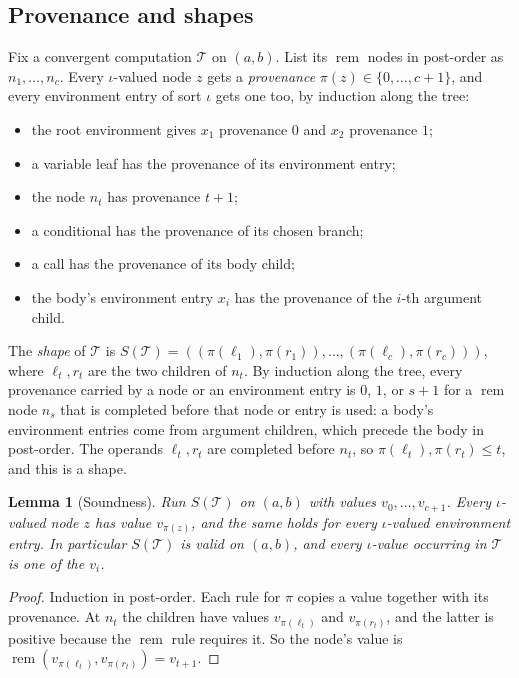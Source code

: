 \documentclass[11pt]{article}
\newtheorem{lemma}[theorem]{Lemma}
\theoremstyle{remark}
\newcommand{\rem}{\operatorname{rem}}
\begin{document}
\subsection{Provenance and shapes}
Fix a convergent computation $\mathcal T$ on $(a,b)$. List its $\rem$ nodes
in post-order as $n_1,\ldots,n_c$. Every $\iota$-valued node $z$ gets a
\emph{provenance} $\pi(z)\in\{0,\ldots,c+1\}$, and every environment entry of
sort $\iota$ gets one too, by induction along the tree:
\begin{itemize}
\item the root environment gives $x_1$ provenance $0$ and $x_2$ provenance $1$;
\item a variable leaf has the provenance of its environment entry;
\item the node $n_t$ has provenance $t+1$;
\item a conditional has the provenance of its chosen branch;
\item a call has the provenance of its body child;
\item the body's environment entry $x_i$ has the provenance of the $i$-th
argument child.
\end{itemize}
The \emph{shape} of $\mathcal T$ is
$S(\mathcal T)=((\pi(\ell_1),\pi(r_1)),\ldots,(\pi(\ell_c),\pi(r_c)))$, where
$\ell_t,r_t$ are the two children of $n_t$. By induction along the tree,
every provenance carried by a node or an environment entry is $0$, $1$, or
$s+1$ for a $\rem$ node $n_s$ that is completed before that node or entry is
used: a body's environment entries come from argument children, which precede
the body in post-order. The operands $\ell_t,r_t$ are completed before $n_t$,
so $\pi(\ell_t),\pi(r_t)\leq t$, and this is a shape.

\begin{lemma}[Soundness]\label{lem:sound}
Run $S(\mathcal T)$ on $(a,b)$ with values $v_0,\ldots,v_{c+1}$. Every
$\iota$-valued node $z$ has value $v_{\pi(z)}$, and the same holds for every
$\iota$-valued environment entry. In particular $S(\mathcal T)$ is valid on
$(a,b)$, and every $\iota$-value occurring in $\mathcal T$ is one of the
$v_i$.
\end{lemma}

\begin{proof}
Induction in post-order. Each rule for $\pi$ copies a value together with its
provenance. At $n_t$ the children have values $v_{\pi(\ell_t)}$ and
$v_{\pi(r_t)}$, and the latter is positive because the $\rem$ rule requires
it. So the node's value is $\rem(v_{\pi(\ell_t)},v_{\pi(r_t)})=v_{t+1}$.
\end{proof}
\end{document}
